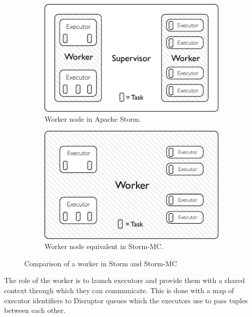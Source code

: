 \begin{figure}[!htb]
\centering
\begin{subfigure}{.5\textwidth}
  \centering
  \includegraphics[width=0.95\linewidth]{pdf/distributed_worker.pdf}
  \caption{Worker node in Apache Storm.}
  \label{fig:comparison1}
\end{subfigure}%
\begin{subfigure}{.5\textwidth}
  \centering
  \includegraphics[width=0.95\linewidth]{pdf/local_worker.pdf}
  \caption{Worker node equivalent in Storm-MC.}
  \label{fig:comparison2}
\end{subfigure}
\caption{Comparison of a worker in Storm and Storm-MC}
\label{fig:comparison}
\end{figure}

The role of the worker is to launch executors and provide them with a shared context through which they can communicate. This is done with a map of executor identifiers to Disruptor queues which the executors use to pass tuples between each other.


